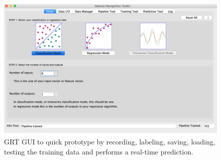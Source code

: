 \begin{figure}
	[h] \centering 
	\includegraphics[height=7cm]{figures/content/grt-gui.jpg} \caption{GRT GUI to quick prototype by recording, labeling, saving, loading, testing the training data and performs a real-time prediction. \cite{grt-spec}} \label{fg:grt:gui} 
\end{figure}

